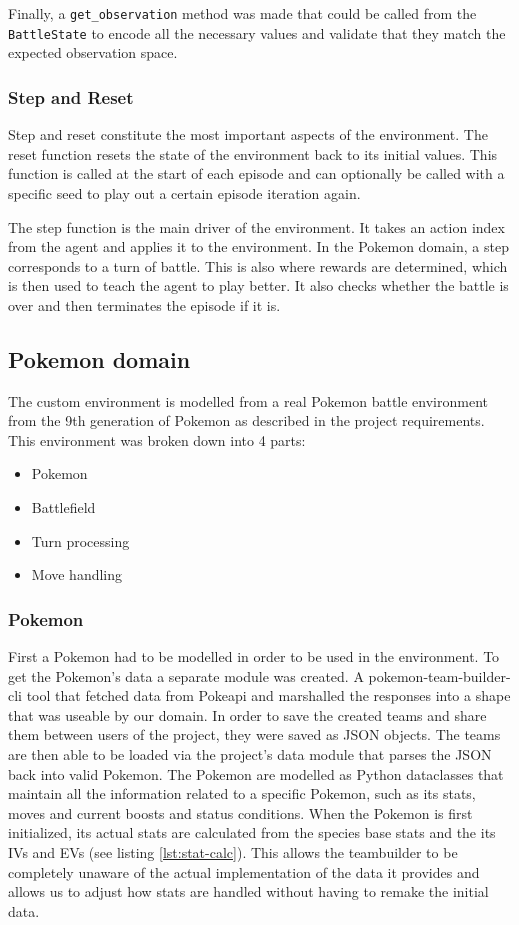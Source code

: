 Finally, a \lstinline|get_observation| method was made that could be called from the \lstinline|BattleState| to encode 
all the necessary values and validate that they match the expected observation space.

\subsubsection{Step and Reset}
Step and reset constitute the most important aspects of the environment. The reset function resets the state of the environment back to its initial values.
This function is called at the start of each episode and can optionally be called with a specific seed to play out a certain episode iteration again.

The step function is the main driver of the environment. It takes an action index from the agent and applies it to the environment. In the Pokemon domain, a step corresponds
to a turn of battle. This is also where rewards are determined, which is then used to teach the agent to play better. It also checks whether the battle is over and then
terminates the episode if it is. 

\subsection{Pokemon domain}
\label{subsec:pokemon-domain}
The custom environment is modelled from a real Pokemon battle environment from the 9th generation of Pokemon as described in the project requirements.
This environment was broken down into 4 parts:
\begin{itemize}
    \item Pokemon
    \item Battlefield
    \item Turn processing
    \item Move handling
\end{itemize}

\subsubsection{Pokemon}
First a Pokemon had to be modelled in order to be used in the environment.
To get the Pokemon's data a separate module was created. A pokemon-team-builder-cli \cite{TeambuilderCli} tool that
fetched data from Pokeapi \cite{PokeAPI} and marshalled the responses into a shape that was useable by our domain.
In order to save the created teams and share them between users of the project, they were saved as JSON objects.
The teams are then able to be loaded via the project's data module that parses the JSON back into valid Pokemon.
The Pokemon are modelled as Python dataclasses that maintain all the information related to a specific Pokemon, such as
its stats, moves and current boosts and status conditions. When the Pokemon is first initialized, its actual stats
are calculated from the species base stats and the its IVs and EVs (see listing \ref{lst:stat-calc}). This allows the teambuilder to be
completely unaware of the actual implementation of the data it provides and allows us to adjust how stats are handled
without having to remake the initial data.

